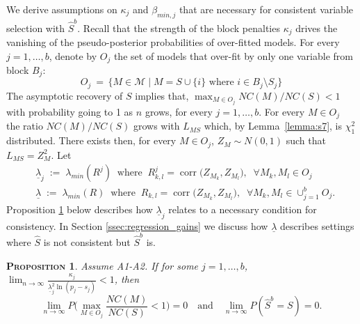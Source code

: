 \documentclass[aos]{imsart}
\theoremstyle{plain}
\newtheorem{prop}[thm]{\textsc{Proposition}}
\newcommand{\paul}[1]{{\small{\color{green} \sf $\spadesuit$ Paul: #1}}}
\newcommand{\M}{\mathcal{M}}
\begin{document}
We derive assumptions on $\kappa_j$ and $\beta_{min,j}$ that are necessary for consistent variable selection with $\hat{S}^b$. Recall that the strength of the block penalties $\kappa_j$ drives the vanishing of the pseudo-posterior probabilities of over-fitted models.
For every $j=1,\ldots,b$, denote by $O_j$ the set of models that over-fit by only one variable from block $B_j$:
$$O_j \:=\,\{M\in \M\;|\; M=S\cup\{i\} \text{ where } i\in B_j\setminus S_j\}$$
The asymptotic recovery of $S$ implies that, $\max_{M\in O_j}NC(M)/NC(S)<1$ with probability going to 1 as $n$ grows, for every $j=1,\ldots,b$. For every $M \in O_j$ the ratio $NC(M)/NC(S)$ grows with $L_{MS}$
which, by Lemma~\ref{lemma:s7}, is $\chi^2_1$ distributed. There exists then, for every $M \in O_j$, $Z_M \sim N(0,1)$ such that $L_{MS}=Z_{M}^2$.
Let
\begin{align}
    &\underline{\lambda}_j\;:=\;\lambda_{min}(R^j)\;\;\text{where} \;\;R^j_{k,l}=\operatorname{corr}\big(Z_{M_k},Z_{M_l}\big),\;\;\forall M_k,M_l \in O_j
    \nonumber \\
    &\underline{\lambda}\;:=\;\lambda_{min}(R)\;\;\text{where} \;\;R_{k,l}=\operatorname{corr}\big(Z_{M_k},Z_{M_l}\big),\;\;\forall M_k,M_l \in \cup_{j=1}^b O_j.
    \nonumber
\end{align}
Proposition \ref{prop:nectypeIreg} below describes how $\underline{\lambda}_j$ relates to a necessary condition for consistency.
In Section \ref{ssec:regression_gains} we discuss how $\underline{\lambda}$ describes settings where $\hat S$ is not consistent but $\hat S^b$ is. \color{black}
\begin{prop}\label{prop:nectypeIreg}
Assume A1-A2.
     If for some $j=1,\ldots,b$,  $\lim_{n\to\infty}\frac{\kappa_j}{\underline{\lambda}_j^2\ln(p_j-s_j)} <1$, then  %
     $$\lim_{n \to \infty} P\Big(\max_{M\in O_j}\frac{NC(M)}{NC(S)}<1\Big)= 0 \quad\text{and}\quad \lim_{n \to \infty} P(\hat{S}^b=S)= 0.$$
\end{prop}
\end{document}
